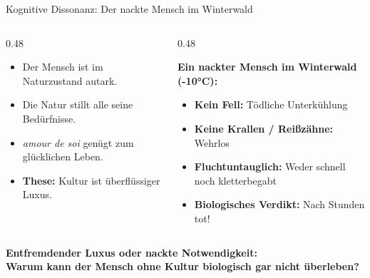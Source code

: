 \documentclass[aspectratio=169, 10pt]{beamer}
\begin{document}
\begin{frame}{Kognitive Dissonanz: Der nackte Mensch im Winterwald}
    \vspace{-0.3cm}
    \begin{columns}[T]
        \begin{column}{0.48\textwidth}
            \begin{tcolorbox}[rousseauNature, title={\faQuestionCircle\ Rousseaus Naturideal}]
                \begin{itemize}\setlength{\itemsep}{1.5pt}\footnotesize
                    \item Der Mensch ist im Naturzustand autark.
                    \item Die Natur stillt alle seine Bedürfnisse.
                    \item \textit{amour de soi} genügt zum glücklichen Leben.
                    \item \textbf{These:} Kultur ist überflüssiger Luxus.
                \end{itemize}
            \end{tcolorbox}
        \end{column}

        \begin{column}{0.48\textwidth}
            \begin{tcolorbox}[rousseauCulture, title={\faBolt\ Das biologische Gedankenexperiment}]
                \textbf{Ein nackter Mensch im Winterwald (-10°C):}
                \begin{itemize}\setlength{\itemsep}{1.5pt}\footnotesize
                    \item \textbf{Kein Fell:} Tödliche Unterkühlung
                    \item \textbf{Keine Krallen / Reißzähne:} Wehrlos
                    \item \textbf{Fluchtuntauglich:} Weder schnell noch kletterbegabt
                    \item \textbf{Biologisches Verdikt:} Nach Stunden tot!
                \end{itemize}
            \end{tcolorbox}
        \end{column}
    \end{columns}

    \vspace{0.15cm}
    \begin{tcolorbox}[alertCard, title={\faExclamationTriangle\ Die Leitfrage unserer Doppelstunde}]
        \centering\small\bfseries
        \glqq Entfremdender Luxus oder nackte Notwendigkeit:\\
        Warum kann der Mensch ohne Kultur biologisch gar nicht überleben?\grqq
    \end{tcolorbox}
\end{frame}
\end{document}
